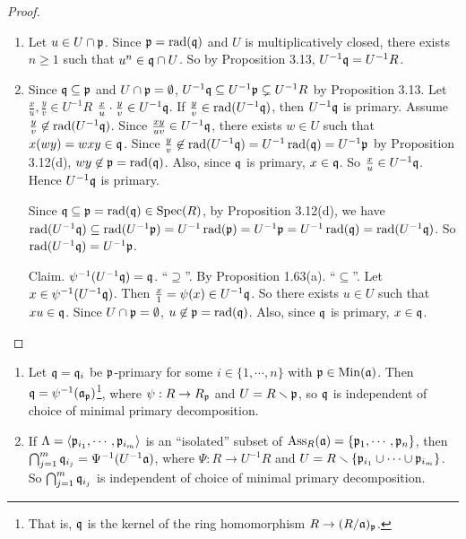 \begin{proof}
    \begin{enumerate}
        \item Let $u \in U \cap \mathfrak{p}$. Since $\mathfrak{p} = \operatorname{rad}(\mathfrak{q})$ and $U$ is multiplicatively closed, there exists $n \geq 1$ such that $u^{n} \in \mathfrak{q} \cap U$. So by Proposition 3.13, $U^{-1}\mathfrak{q} = U^{-1}R$.
        \item Since $\mathfrak{q} \subseteq \mathfrak{p}$ and $U \cap \mathfrak{p} = \emptyset$, $U^{-1}\mathfrak{q} \subseteq U^{-1}\mathfrak{p} \subsetneq U^{-1}R$ by Proposition 3.13. Let $\frac{x}{u},\frac{y}{v} \in U^{-1}R$ $\frac{x}{u} \cdot \frac{y}{v} \in U^{-1}\mathfrak{q}$. If $\frac{y}{v} \in \operatorname{rad}(U^{-1}\mathfrak{q})$, then $U^{-1}\mathfrak{q}$ is primary. Assume $\frac{y}{v} \not \in \operatorname{rad}(U^{-1}\mathfrak{q})$. Since $\frac{xy}{uv} \in U^{-1}\mathfrak{q}$, there exists $w \in U$ such that $x(wy) = wxy \in \mathfrak{q}$. Since $\frac{y}{v} \not\in \operatorname{rad}(U^{-1}\mathfrak{q}) = U^{-1} \operatorname{rad}(\mathfrak{q}) = U^{-1}\mathfrak{p}$ by Proposition 3.12(d), $wy \not \in \mathfrak{p} = \operatorname{rad}(\mathfrak{q})$. Also, since $\mathfrak{q}$ is primary, $x \in \mathfrak{q}$. So $\frac{x}{u} \in U^{-1}\mathfrak{q}$. Hence $U^{-1}\mathfrak{q}$ is primary. \par 
            Since $\mathfrak{q} \subseteq \mathfrak{p} = \operatorname{rad}(\mathfrak{q}) \in \operatorname{Spec}(R)$, by Proposition 3.12(d), we have $\operatorname{rad}(U^{-1}\mathfrak{q}) \subseteq \operatorname{rad}(U^{-1}\mathfrak{p}) = U^{-1} \operatorname{rad}(\mathfrak{p}) = U^{-1}\mathfrak{p} = U^{-1} \operatorname{rad}(\mathfrak{q}) = \operatorname{rad}(U^{-1}\mathfrak{q})$. So $\operatorname{rad}(U^{-1}\mathfrak{q}) = U^{-1}\mathfrak{p}$. \par
            Claim. $\psi^{-1}(U^{-1}\mathfrak{q}) = \mathfrak{q}$. ``$\supseteq$''. By Proposition 1.63(a). ``$\subseteq$''. Let $x \in \psi^{-1}(U^{-1}\mathfrak{q})$. Then $\frac{x}{1} = \psi(x) \in U^{-1}\mathfrak{q}$. So there exists $u \in U$ such that $xu \in \mathfrak{q}$. Since $U \cap \mathfrak{p} = \emptyset$, $u \not \in \mathfrak{p} = \operatorname{rad}(\mathfrak{q})$. Also, since $\mathfrak{q}$ is primary, $x \in \mathfrak{q}$. \qedhere
    \end{enumerate}
\end{proof}

\begin{theorem}
    \begin{enumerate}
        \item Let $\mathfrak{q} = \mathfrak{q}_i$ be $\mathfrak{p}$-primary for some $i \in \{1,\cdots,n\}$ 
            with $\mathfrak{p} \in \operatorname{Min}(\mathfrak{a})$. Then $\mathfrak{q} = \psi^{-1}(\mathfrak{a}_{\mathfrak{p}})$\footnote[2]{That is, $\mathfrak{q}$ is the kernel of the ring homomorphism $R \to (R/\mathfrak{a})_{\mathfrak{p}}$.}, where $\psi: R \to R_{\mathfrak{p}}$ and $U = R \smallsetminus \mathfrak{p}$, so $\mathfrak{q}$ is independent of choice of minimal primary decomposition.
        \item If $\Lambda = \langle \mathfrak{p}_{i_1},\cdots,\mathfrak{p}_{i_m} \rangle$ is an ``isolated'' subset of $\operatorname{Ass}_R(\mathfrak{a}) = \{\mathfrak{p}_1,\cdots,\mathfrak{p}_n\}$, then $\bigcap_{j=1}^{m} \mathfrak{q}_{i_j} = \Psi^{-1}(U^{-1}\mathfrak{a})$, where $\Psi: R \to U^{-1}R$ and $U = R \smallsetminus \{\mathfrak{p}_{i_1} \cup \cdots \cup \mathfrak{p}_{i_m}\}$. So $\bigcap_{j=1}^{m}\mathfrak{q}_{i_j}$ is independent of choice of minimal primary decomposition.
    \end{enumerate}
\end{theorem}

